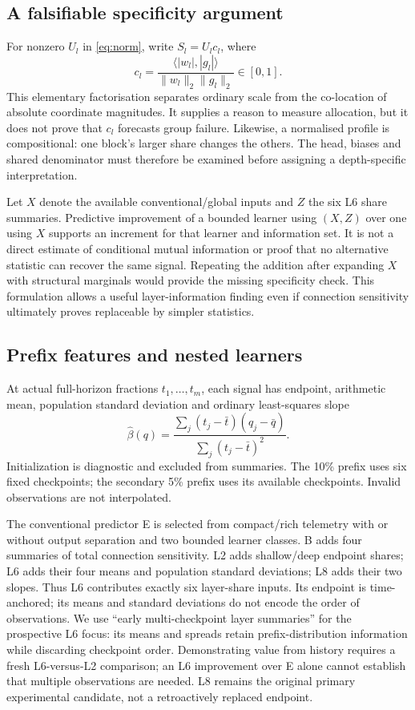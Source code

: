 \documentclass[nolineno]{ieeeaccess}
\begin{document}
\subsection{A falsifiable specificity argument}
For nonzero $U_l$ in \eqref{eq:norm}, write $S_l=U_l c_l$, where
\begin{equation}
c_l=\frac{\langle|w_l|,|g_l|\rangle}{\|w_l\|_2\|g_l\|_2}\in[0,1].
\end{equation}
This elementary factorisation separates ordinary scale from the co-location of absolute coordinate magnitudes. It supplies a reason to measure allocation, but it does not prove that $c_l$ forecasts group failure. Likewise, a normalised profile is compositional: one block's larger share changes the others. The head, biases and shared denominator must therefore be examined before assigning a depth-specific interpretation.

Let $X$ denote the available conventional/global inputs and $Z$ the six L6 share summaries. Predictive improvement of a bounded learner using $(X,Z)$ over one using $X$ supports an increment for that learner and information set. It is not a direct estimate of conditional mutual information or proof that no alternative statistic can recover the same signal. Repeating the addition after expanding $X$ with structural marginals would provide the missing specificity check. This formulation allows a useful layer-information finding even if connection sensitivity ultimately proves replaceable by simpler statistics.

\subsection{Prefix features and nested learners}
At actual full-horizon fractions $t_1,\ldots,t_m$, each signal has endpoint, arithmetic mean, population standard deviation and ordinary least-squares slope
\begin{equation}
\widehat\beta(q)=\frac{\sum_j(t_j-\bar t)(q_j-\bar q)}{\sum_j(t_j-\bar t)^2}.
\label{eq:slope}
\end{equation}
Initialization is diagnostic and excluded from summaries. The 10\% prefix uses six fixed checkpoints; the secondary 5\% prefix uses its available checkpoints. Invalid observations are not interpolated.

The conventional predictor E is selected from compact/rich telemetry with or without output separation and two bounded learner classes. B adds four summaries of total connection sensitivity. L2 adds shallow/deep endpoint shares; L6 adds their four means and population standard deviations; L8 adds their two slopes. Thus L6 contributes exactly six layer-share inputs. Its endpoint is time-anchored; its means and standard deviations do not encode the order of observations. We use ``early multi-checkpoint layer summaries'' for the prospective L6 focus: its means and spreads retain prefix-distribution information while discarding checkpoint order. Demonstrating value from history requires a fresh L6-versus-L2 comparison; an L6 improvement over E alone cannot establish that multiple observations are needed. L8 remains the original primary experimental candidate, not a retroactively replaced endpoint.
\end{document}

